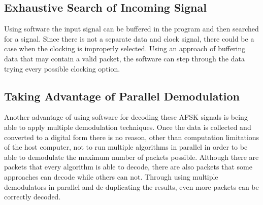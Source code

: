 \subsection{Exhaustive Search of Incoming Signal}
Using software the input signal can be buffered in the program and then searched for a signal. Since there is not a separate data and clock signal, there could be a case when the clocking is improperly selected. Using an approach of buffering data that may contain a valid packet, the software can step through the data trying every possible clocking option.

\subsection{Taking Advantage of Parallel Demodulation}
Another advantage of using software for decoding these AFSK signals is being able to apply multiple demodulation techniques. Once the data is collected and converted to a digital form there is no reason, other than computation limitations of the host computer, not to run multiple algorithms in parallel in order to be able to demodulate the maximum number of packets possible. Although there are packets that every algorithm is able to decode, there are also packets that some approaches can decode while others can not. Through using multiple demodulators in parallel and de-duplicating the results, even more packets can be correctly decoded.
